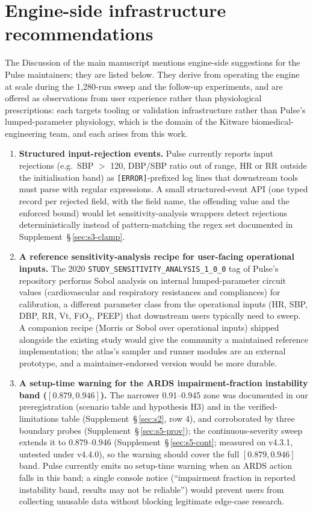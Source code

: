 \documentclass[pdflatex,sn-nature]{sn-jnl}%
\begin{document}
\section{Engine-side infrastructure recommendations}\label{sec:s11}

The Discussion of the main manuscript mentions engine-side suggestions for the Pulse maintainers; they are listed below. They derive from operating the engine at scale during the 1{,}280-run sweep and the follow-up experiments, and are offered as observations from user experience rather than physiological prescriptions: each targets tooling or validation infrastructure rather than Pulse's lumped-parameter physiology, which is the domain of the Kitware biomedical-engineering team, and each arises from this work.

\begin{enumerate}
\item \textbf{Structured input-rejection events.} Pulse currently reports input rejections (e.g.\ SBP $>$ 120, DBP/SBP ratio out of range, HR or RR outside the initialisation band) as \texttt{[ERROR]}-prefixed log lines that downstream tools must parse with regular expressions. A small structured-event API (one typed record per rejected field, with the field name, the offending value and the enforced bound) would let sensitivity-analysis wrappers detect rejections deterministically instead of pattern-matching the regex set documented in Supplement~\S\,\ref{sec:s3-clamp}.

\item \textbf{A reference sensitivity-analysis recipe for user-facing operational inputs.} The 2020 \texttt{STUDY\_SENSITIVITY\_ANALYSIS\_1\_0\_0} tag of Pulse's repository performs Sobol analysis on internal lumped-parameter circuit values (cardiovascular and respiratory resistances and compliances) for calibration, a different parameter class from the operational inputs (HR, SBP, DBP, RR, Vt, FiO$_2$, PEEP) that downstream users typically need to sweep. A companion recipe (Morris or Sobol over operational inputs) shipped alongside the existing study would give the community a maintained reference implementation; the atlas's sampler and runner modules are an external prototype, and a maintainer-endorsed version would be more durable.

\item \textbf{A setup-time warning for the ARDS impairment-fraction instability band ($[0.879, 0.946]$).} The narrower 0.91--0.945 zone was documented in our preregistration (scenario table and hypothesis H3) and in the verified-limitations table (Supplement~\S\,\ref{sec:s2}, row 4), and corroborated by three boundary probes (Supplement~\S\,\ref{sec:s5-prov}); the continuous-severity sweep extends it to 0.879--0.946 (Supplement~\S\,\ref{sec:s5-cont}; measured on v4.3.1, untested under v4.4.0), so the warning should cover the full $[0.879, 0.946]$ band. Pulse currently emits no setup-time warning when an ARDS action falls in this band; a single console notice (``impairment fraction in reported instability band, results may not be reliable'') would prevent users from collecting unusable data without blocking legitimate edge-case research.


\end{enumerate}
\end{document}

